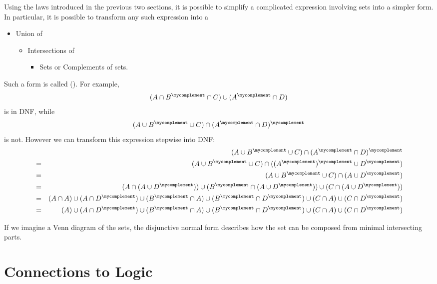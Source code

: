 Using the laws introduced in the previous two sections, it is possible to
simplify a complicated expression involving sets into a simpler form. In
particular, it is possible to transform any such expression into a 
\begin{itemize}
\itemsep-2mm
\item[] Union of
\begin{itemize}
\itemsep-2mm
\item[] Intersections of
\begin{itemize}
\itemsep-2mm
\item[] Sets or Complements of sets.
\end{itemize}
\end{itemize}
\end{itemize}
Such a form is called  (). For example, 
\[
(A\cap B^\mycomplement\cap C)\cup (A^\mycomplement\cap D)
\]
is in DNF, while
\[
(A\cup B^\mycomplement\cup C)\cap (A^\mycomplement\cap D)^\mycomplement
\]
is not. However we can transform this expression stepwise into DNF:
\begin{eqnarray*}
&&(A\cup B^\mycomplement\cup C)\cap (A^\mycomplement\cap D)^\mycomplement\\
&=&(A\cup B^\mycomplement\cup C)\cap ((A^\mycomplement)^\mycomplement\cup
D^\mycomplement)\\
&=&(A\cup B^\mycomplement\cup C)\cap (A\cup D^\mycomplement)\\
&=&(A\cap (A\cup D^\mycomplement))\cup (B^\mycomplement\cap (A\cup
D^\mycomplement))\cup (C\cap (A\cup D^\mycomplement))\\
&=&(A\cap A)\cup (A\cap D^\mycomplement)\cup (B^\mycomplement\cap A)\cup
(B^\mycomplement\cap D^\mycomplement)\cup (C\cap A)\cup (C\cap D^\mycomplement)\\
&=&(A)\cup (A\cap D^\mycomplement)\cup (B^\mycomplement\cap A)\cup
(B^\mycomplement\cap D^\mycomplement)\cup (C\cap A)\cup (C\cap D^\mycomplement)\\
\end{eqnarray*}

If we imagine a Venn diagram of the sets, the disjunctive normal form
describes how the set can be composed from minimal intersecting parts.

\section{Connections to Logic}
\label{seclogic}

